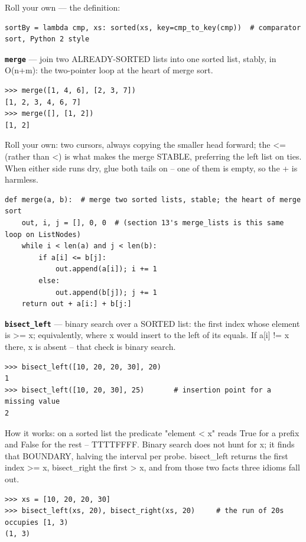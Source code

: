 \documentclass[10pt,letterpaper]{article}
\begin{document}
Roll your own --- the definition:

\begin{lstlisting}[style=ex]
sortBy = lambda cmp, xs: sorted(xs, key=cmp_to_key(cmp))  # comparator sort, Python 2 style
\end{lstlisting}
\textbf{\texttt{merge}} --- join two ALREADY-SORTED lists into one sorted list, stably, in O(n+m): the two-pointer loop at the heart of merge sort.
\begin{lstlisting}[style=ex]
>>> merge([1, 4, 6], [2, 3, 7])
[1, 2, 3, 4, 6, 7]
>>> merge([], [1, 2])
[1, 2]
\end{lstlisting}

Roll your own: two cursors, always copying the smaller head forward; the <= (rather than <) is what makes the merge STABLE, preferring the left list on ties. When either side runs dry, glue both tails on -- one of them is empty, so the + is harmless.

\begin{lstlisting}[style=ex]
def merge(a, b):  # merge two sorted lists, stable; the heart of merge sort
    out, i, j = [], 0, 0  # (section 13's merge_lists is this same loop on ListNodes)
    while i < len(a) and j < len(b):
        if a[i] <= b[j]:
            out.append(a[i]); i += 1
        else:
            out.append(b[j]); j += 1
    return out + a[i:] + b[j:]
\end{lstlisting}
\textbf{\texttt{bisect\_left}} --- binary search over a SORTED list: the first index whose element is >= x; equivalently, where x would insert to the left of its equals. If a[i] != x there, x is absent -- that check is binary search.
\begin{lstlisting}[style=ex]
>>> bisect_left([10, 20, 20, 30], 20)
1
>>> bisect_left([10, 20, 30], 25)       # insertion point for a missing value
2
\end{lstlisting}

How it works: on a sorted list the predicate "element < x" reads True for a prefix and False for the rest -- TTTTFFFF. Binary search does not hunt for x; it finds that BOUNDARY, halving the interval per probe. bisect\_left returns the first index >= x, bisect\_right the first > x, and from those two facts three idioms fall out.

\begin{lstlisting}[style=ex]
>>> xs = [10, 20, 20, 30]
>>> bisect_left(xs, 20), bisect_right(xs, 20)     # the run of 20s occupies [1, 3)
(1, 3)
\end{lstlisting}
\end{document}
